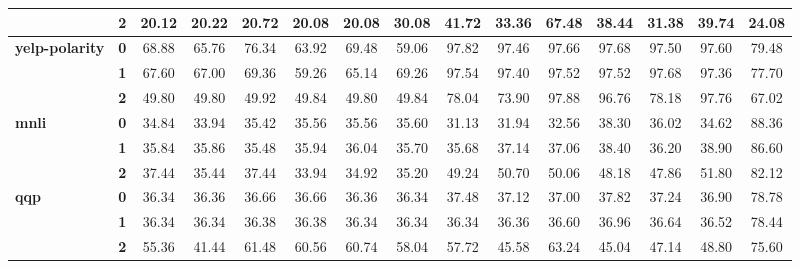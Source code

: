 \begin{table*}[h]
\begin{tabular}{llccccccccccccc}
		& \textbf{2} & 20.12      & 20.22      & 20.72      & 20.08      & 20.08      & 30.08      & 41.72       & 33.36       & 67.48      & 38.44        & 31.38        & 39.74        & 24.08      \\
		\hline
		\multirow{3}{*}{\textbf{yelp-polarity}} & \textbf{0} & 68.88      & 65.76      & 76.34      & 63.92      & 69.48      & 59.06      & 97.82       & 97.46       & 97.66      & 97.68        & 97.50        & 97.60        & 79.48      \\
		& \textbf{1} & 67.60      & 67.00      & 69.36      & 59.26      & 65.14      & 69.26      & 97.54       & 97.40       & 97.52      & 97.52        & 97.68        & 97.36        & 77.70      \\
		& \textbf{2} & 49.80      & 49.80      & 49.92      & 49.84      & 49.80      & 49.84      & 78.04       & 73.90       & 97.88      & 96.76        & 78.18        & 97.76        & 67.02      \\
		\hline
		\multirow{3}{*}{\textbf{mnli}}          & \textbf{0} & 34.84      & 33.94      & 35.42      & 35.56      & 35.56      & 35.60      & 31.13       & 31.94       & 32.56      & 38.30        & 36.02        & 34.62        & 88.36      \\
		& \textbf{1} & 35.84      & 35.86      & 35.48      & 35.94      & 36.04      & 35.70      & 35.68       & 37.14       & 37.06      & 38.40        & 36.20        & 38.90        & 86.60      \\
		& \textbf{2} & 37.44      & 35.44      & 37.44      & 33.94      & 34.92      & 35.20      & 49.24       & 50.70       & 50.06      & 48.18        & 47.86        & 51.80        & 82.12      \\
		\hline
		\multirow{3}{*}{\textbf{qqp}}           & \textbf{0} & 36.34      & 36.36      & 36.66      & 36.66      & 36.36      & 36.34      & 37.48       & 37.12       & 37.00      & 37.82        & 37.24        & 36.90        & 78.78      \\
		& \textbf{1} & 36.34      & 36.34      & 36.38      & 36.38      & 36.34      & 36.34      & 36.34       & 36.36       & 36.60      & 36.96        & 36.64        & 36.52        & 78.44      \\
		& \textbf{2} & 55.36      & 41.44      & 61.48      & 60.56      & 60.74      & 58.04      & 57.72       & 45.58       & 63.24      & 45.04        & 47.14        & 48.80        & 75.60      \\
		\bottomrule
	\end{tabular}
	

\end{table*}
